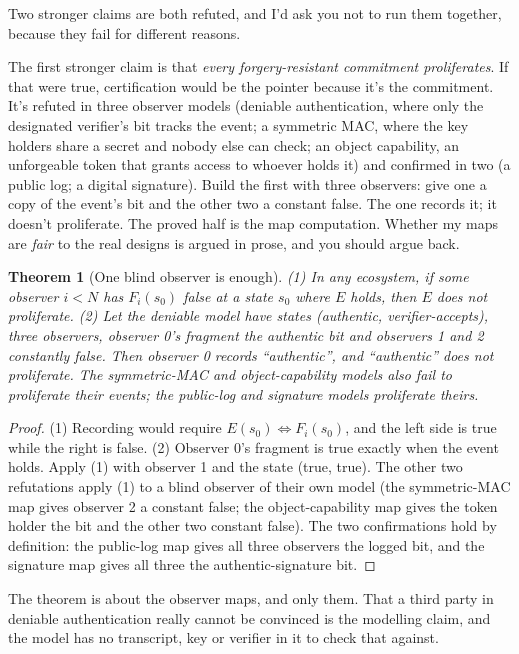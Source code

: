 \documentclass[11pt,twoside]{article}
\theoremstyle{thielethm}
\newtheorem{theorem}{Theorem}[section]
\theoremstyle{thieledef}
\theoremstyle{thieledef}
\theoremstyle{thieledef}
\theoremstyle{thielethm}
\theoremstyle{thieleobs}
\theoremstyle{thielethm}
\begin{document}
Two stronger claims are both refuted, and I'd ask you not to run them together, because they fail for
different reasons.

The first stronger claim is that \emph{every forgery-resistant commitment proliferates}. If that were
true, certification would be the pointer because it's the commitment. It's refuted in three
observer models (deniable authentication, where only the designated verifier's bit tracks the
event; a symmetric MAC, where the key holders share a secret and nobody else can check; an
object capability, an unforgeable token that grants access to whoever holds it) and
confirmed in two (a public log; a digital signature). Build the first
with three observers: give one a copy of the event's bit and the other two a constant false.
The one records it; it doesn't proliferate. The proved half is the map computation. Whether
my maps are \emph{fair} to the real designs is argued in prose, and you should argue back.

\begin{theorem}[One blind observer is enough]\label{thm:u14-blind}
(1) In any ecosystem, if some observer $i < N$ has $F_i(s_0)$ false at a state $s_0$ where
$E$ holds, then $E$ does not proliferate. (2) Let the deniable model have states (authentic,
verifier-accepts), three observers, observer 0's fragment the authentic bit and observers 1
and 2 constantly false. Then observer 0 records ``authentic'', and ``authentic'' does not
proliferate. The symmetric-MAC and object-capability models also fail to proliferate their
events; the public-log and signature models proliferate theirs.
\end{theorem}

\begin{proof}
(1) Recording would require $E(s_0) \iff F_i(s_0)$, and the left side is true while the right
is false. (2) Observer 0's fragment is true exactly when the event holds. Apply (1) with observer 1 and
the state (true, true). The other two refutations apply (1) to a blind observer of their own model (the symmetric-MAC map gives observer 2 a constant false; the object-capability map gives the token holder the bit and the other two constant false). The two confirmations hold by definition: the public-log map gives all three observers the logged bit, and the signature map gives all three the authentic-signature bit.
\end{proof}

The theorem is about the observer maps, and only them. That a third
party in deniable authentication really cannot be convinced is the modelling claim, and the
model has no transcript, key or verifier in it to check that against.
\end{document}
